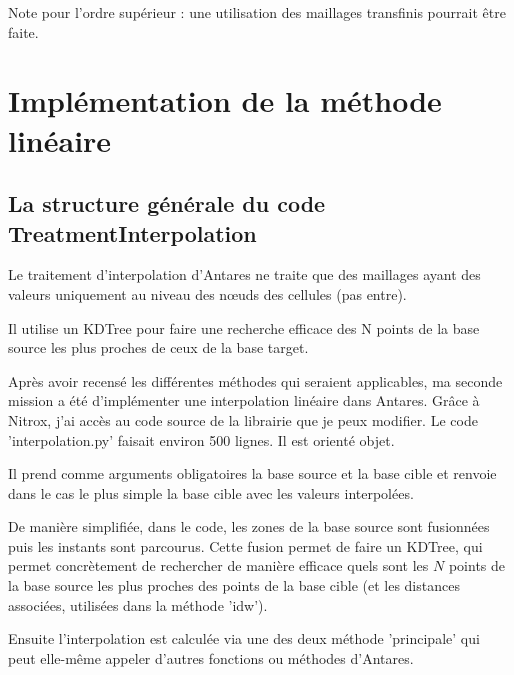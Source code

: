 Note pour l'ordre supérieur : une utilisation des maillages transfinis pourrait être faite. \cite{camarero2024}






\section{Implémentation de la méthode linéaire}

\subsection{La structure générale du code TreatmentInterpolation}

Le traitement d'interpolation d'Antares ne traite que des maillages ayant des valeurs uniquement au niveau des nœuds des cellules (pas entre).

Il utilise un \ac{KDTree} pour faire une recherche efficace des N points de la base source les plus proches de ceux de la base target.


Après avoir recensé les différentes méthodes qui seraient applicables, ma seconde mission a été d'implémenter une interpolation linéaire dans Antares. Grâce à Nitrox, j'ai accès au code source de la librairie que je peux modifier. Le code 'interpolation.py' faisait environ 500 lignes. Il est orienté objet. 






Il prend comme arguments obligatoires la base source et la base cible et renvoie dans le cas le plus simple la base cible avec les valeurs interpolées.



De manière simplifiée, dans le code, les zones de la base source sont fusionnées puis les instants sont parcourus. 
Cette fusion permet de faire un KDTree, qui permet concrètement de rechercher de manière efficace quels sont les \( N \) points de la base source les plus proches des points de la base cible (et les distances associées, utilisées dans la méthode 'idw').

Ensuite l'interpolation est calculée via une des deux méthode 'principale' qui peut elle-même appeler d'autres fonctions ou méthodes d'Antares. %



